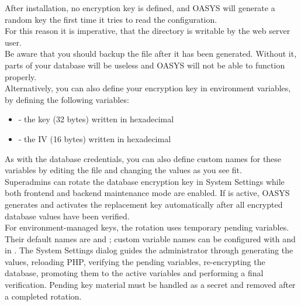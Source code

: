 \documentclass[12pt]{article} %
\begin{document}
    After installation, no encryption key is defined, and OASYS will generate a random key the first time it tries to read the configuration.\\

    For this reason it is imperative, that the directory  is writable by the web server user.\\

    Be aware that you should backup the file  after it has been generated. Without it, parts of your database will be useless and OASYS will not be able to function properly.\\

    Alternatively, you can also define your encryption key in environment variables, by defining the following variables:
    \begin{itemize}
        \item {} - the key (32 bytes) written in hexadecimal
        \item {} - the IV (16 bytes) written in hexadecimal
    \end{itemize}
    \vspace{0.3cm}

    As with the database credentials, you can also define custom names for these variables by editing the file  and changing the values as you see fit.\\

    Superadmins can rotate the database encryption key in System Settings while both frontend and backend maintenance mode are enabled. If  is active, OASYS generates and activates the replacement key automatically after all encrypted database values have been verified.\\

    For environment-managed keys, the rotation uses temporary pending variables. Their default names are  and ; custom variable names can be configured with  and  in . The System Settings dialog guides the administrator through generating the values, reloading PHP, verifying the pending variables, re-encrypting the database, promoting them to the active variables and performing a final verification. Pending key material must be handled as a secret and removed after a completed rotation.\\
\end{document}
